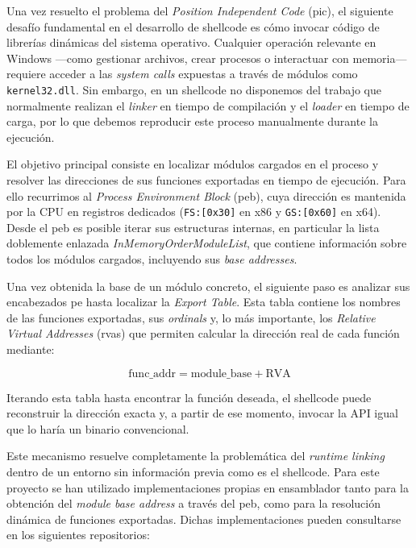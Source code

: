 Una vez resuelto el problema del \textit{Position Independent Code} (\acrshort{pic}), el siguiente desafío fundamental en el desarrollo de shellcode es cómo invocar código de librerías dinámicas del sistema operativo. Cualquier operación relevante en Windows —como gestionar archivos, crear procesos o interactuar con memoria— requiere acceder a las \textit{system calls} expuestas a través de módulos como \texttt{kernel32.dll}. Sin embargo, en un shellcode no disponemos del trabajo que normalmente realizan el \textit{linker} en tiempo de compilación y el \textit{loader} en tiempo de carga, por lo que debemos reproducir este proceso manualmente durante la ejecución.

El objetivo principal consiste en localizar módulos cargados en el proceso y resolver las direcciones de sus funciones exportadas en tiempo de ejecución. Para ello recurrimos al \textit{Process Environment Block} (\acrshort{peb}), cuya dirección es mantenida por la CPU en registros dedicados (\texttt{FS:[0x30]} en x86 y \texttt{GS:[0x60]} en x64). Desde el \acrshort{peb} es posible iterar sus estructuras internas, en particular la lista doblemente enlazada \textit{InMemoryOrderModuleList}, que contiene información sobre todos los módulos cargados, incluyendo sus \textit{base addresses}.

Una vez obtenida la base de un módulo concreto, el siguiente paso es analizar sus encabezados \acrshort{pe} hasta localizar la \textit{Export Table}. Esta tabla contiene los nombres de las funciones exportadas, sus \textit{ordinals} y, lo más importante, los \textit{Relative Virtual Addresses} (\acrshort{rva}s) que permiten calcular la dirección real de cada función mediante:

\[
\text{func\_addr} = \text{module\_base} + \text{RVA}
\]

Iterando esta tabla hasta encontrar la función deseada, el shellcode puede reconstruir la dirección exacta y, a partir de ese momento, invocar la API igual que lo haría un binario convencional.

Este mecanismo resuelve completamente la problemática del \textit{runtime linking} dentro de un entorno sin información previa como es el shellcode. Para este proyecto se han utilizado implementaciones propias en ensamblador tanto para la obtención del \textit{module base address} a través del \acrshort{peb}, como para la resolución dinámica de funciones exportadas. Dichas implementaciones pueden consultarse en los siguientes repositorios:

